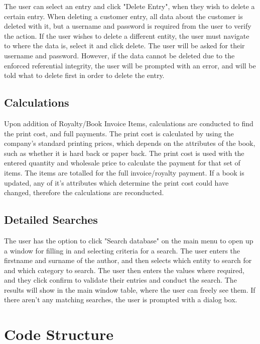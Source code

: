 The user can select an entry and click "Delete Entry", when they wish to delete a certain entry. When deleting a customer entry, all data about the customer is deleted with it, but a username and password is required from the user to verify the action. If the user wishes to delete a different entity, the user must navigate to where the data is, select it and click delete. The user will be asked for their username and password. However, if the data cannot be deleted due to the enforced referential integrity, the user will be prompted with an error, and will be told what to delete first in order to delete the entry.

\subsection{Calculations}

Upon addition of Royalty/Book Invoice Items, calculations are conducted to find the print cost, and full payments. The print cost is calculated by using the company's standard printing prices, which depends on the attributes of the book, such as whether it is hard back or paper back. The print cost is used with the entered quantity and wholesale price to calculate the payment for that set of items. The items are totalled for the full invoice/royalty payment. If a book is updated, any of it's attributes which determine the print cost could have changed, therefore the calculations are reconducted.

\subsection{Detailed Searches}

The user has the option to click "Search database" on the main menu to open up a window for filling in and selecting criteria for a search. The user enters the firstname and surname of the author, and then selects which entity to search for and which category to search. The user then enters the values where required, and they click confirm to validate their entries and conduct the search. The results will show in the main window table, where the user can freely see them. If there aren't any matching searches, the user is prompted with a dialog box.

\section{Code Structure}

